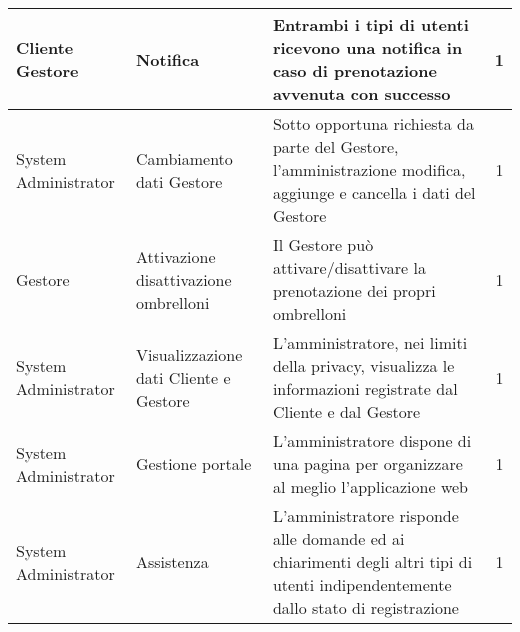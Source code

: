 \begin{tabularx}{\textwidth}{|X|X|X|c|}
\hline\pagebreak
Cliente \newline Gestore & Notifica & Entrambi i tipi di utenti ricevono una notifica in caso di prenotazione avvenuta con successo & 1\\
\hline
System \newline Administrator & Cambiamento \newline dati Gestore & Sotto opportuna richiesta da parte del Gestore, l'amministrazione modifica, aggiunge e cancella i dati del Gestore & 1\\
\hline
Gestore & Attivazione \newline disattivazione ombrelloni & Il Gestore può attivare/disattivare la prenotazione dei propri ombrelloni & 1\\
\hline
System \newline Administrator & Visualizzazione \newline dati Cliente \newline e Gestore & L'amministratore, nei limiti della privacy, visualizza le informazioni registrate dal Cliente e dal Gestore & 1\\
\hline
System \newline Administrator & Gestione portale & L'amministratore dispone di una pagina per organizzare al meglio l'applicazione web & 1\\
\hline
System \newline Administrator & Assistenza & L'amministratore risponde alle domande ed ai chiarimenti degli altri tipi di utenti indipendentemente dallo stato di registrazione & 1\\
\hline
\end{tabularx}
